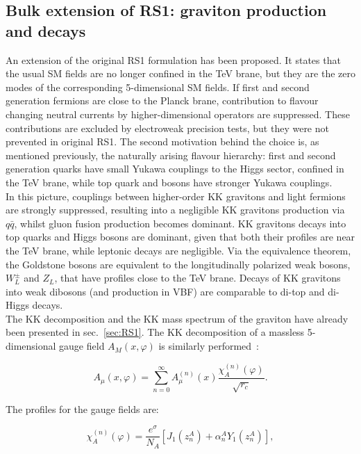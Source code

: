 \subsection{Bulk extension of RS1: graviton production and decays}
\label{sec:BG}
An extension of the original RS1 formulation has been proposed. It states that the usual SM fields are no longer confined in the TeV brane, but they are the zero modes of the corresponding 5-dimensional SM fields. If first and second generation fermions are close to the Planck brane, contribution to flavour changing neutral currents by higher-dimensional operators are suppressed. These contributions are excluded by electroweak precision tests, but they were not prevented in original RS1. The second motivation behind the choice is, as mentioned previously, the naturally arising flavour hierarchy: first and second generation quarks have small Yukawa couplings to the Higgs sector, confined in the TeV brane, while top quark and bosons have stronger Yukawa couplings.\\
In this picture, couplings between higher-order KK gravitons and light fermions are strongly suppressed, resulting into a negligible KK gravitons production via $q \bar{q}$, whilst gluon fusion production becomes dominant. KK gravitons decays into top quarks and Higgs bosons are dominant, given that both their profiles are near the TeV brane, while leptonic decays are negligible. Via the equivalence theorem, the Goldstone bosons are equivalent to the longitudinally polarized weak bosons, $W_L^{\pm}$ and $Z_L$, that have profiles close to the TeV brane. Decays of KK gravitons into weak dibosons (and production in VBF) are comparable to di-top and di-Higgs decays.\\

\noindent The KK decomposition and the KK mass spectrum of the graviton have already been presented in sec.~\ref{sec:RS1}. The KK decomposition of a massless 5-dimensional gauge field $A_M(x, \varphi)$ is similarly performed~\cite{Davoudiasl:2000wi}:

\begin{equation}
A_{\mu}(x, \varphi) = \sum_{n=0}^{\infty} A_{\mu}^{(n)}(x) \frac{\chi^{(n)}_A(\varphi)}{\sqrt{r_c}}.
\label{eq:theory_gauge_KK_tower}
\end{equation}

\noindent The profiles for the gauge fields are:

\begin{equation}
\chi^{(n)}_A(\varphi) = \frac{e^{\sigma}}{N_A} \left[ J_1(z_n^A) + \alpha_n^A Y_1(z_n^A) \right],
\label{eq:theory_gauge_KK_tower_profile}
\end{equation}

